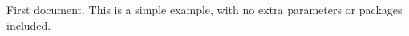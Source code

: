 \documentclass{apa}
\begin{document}
First document. This is a simple example, with no extra parameters or packages included.
\end{document}
